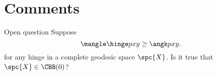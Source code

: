 \section{Comments}


\begin{thm}{Open question}
Suppose 
\[\mangle\hinge p x y\ge \angk p x y.\]
for any hinge in a complete geodesic space $\spc{X}$.
Is it true that $\spc{X}\in \CBB(0)$?
\end{thm}
